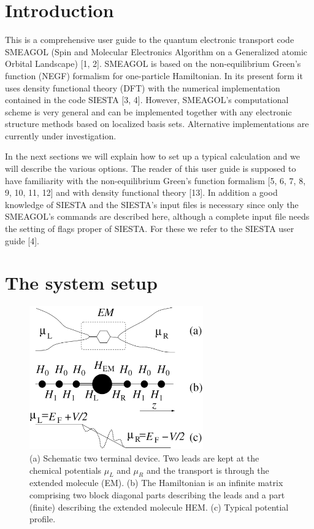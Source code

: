 \documentclass[11pt]{article}
\begin{document}
\section{Introduction}
This is a comprehensive user guide to the quantum electronic transport code SMEAGOL (Spin and Molecular Electronics Algorithm on a Generalized atomic Orbital Landscape) [1, 2].  SMEAGOL is based on the non-equilibrium Green's function (NEGF) formalism for one-particle Hamiltonian. In its present form it uses density functional theory (DFT) with the numerical implementation contained in the code SIESTA [3, 4]. However, SMEAGOL's computational scheme is very general and can be implemented together with any electronic structure methods based on localized basis sets. Alternative implementations are currently under investigation.

In the next sections we will explain how to set up a typical calculation and we will describe the various options. The reader of this user guide is supposed to have familiarity with the non-equilibrium Green's function formalism [5, 6, 7, 8, 9, 10, 11, 12] and with density functional theory [13]. In addition a good knowledge of SIESTA and the SIESTA's input files is necessary since only the SMEAGOL's commands are described here, although a complete input file needs the setting of flags proper of SIESTA. For these we refer to the SIESTA user guide [4].  

\section{The system setup}
\begin{figure}[h]
\center
\includegraphics[width=7.5cm,clip=true]{fig/Fig1}
\caption{ (a) Schematic two terminal device. Two leads are kept at the chemical potentials $\mu_L$ and $\mu_R$ and the transport is through the extended molecule (EM). (b) The Hamiltonian is an infinite matrix
comprising two block diagonal parts describing the leads and a part (finite) describing the extended
molecule HEM. (c) Typical potential profile.}
\label{fig:emschem}
\end{figure}
\end{document}
